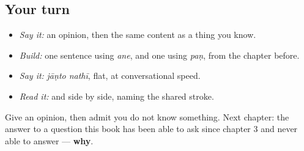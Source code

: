 \subsection*{Your turn}
\begin{itemize}
\raggedright
  \item \emph{Say it:} an opinion, then the same content as a thing you know.
  \item \emph{Build:} one sentence using \emph{ane}, and one using \emph{paṇ}, from the chapter before.
  \item \emph{Say it:} \emph{jāṇto nathī}, flat, at conversational speed.
  \item \emph{Read it:} \textbf{} and \textbf{} side by side, naming the shared stroke.
\end{itemize}

\begin{tcolorbox}[breakable,colback=teal!4,colframe=teal!35!black,title={Before you move on}]
Give an opinion, then admit you do not know something. Next chapter: the answer to a question this book has been able to ask since chapter 3 and never able to answer — \textbf{why}.
\end{tcolorbox}
